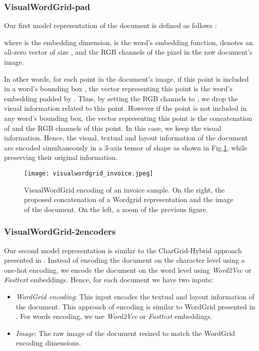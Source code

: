\documentclass[runningheads]{llncs}
\begin{document}
\subsubsection{VisualWordGrid-pad}\hfill

Our first model representation of the document is defined as follows :
 


where  is the embedding dimension,  is the  word's embedding function,  denotes an all-zero vector of size , and  the RGB channels of the  pixel in the raw document's image. 

In other words, for each point in the document's image, if this point is included in a word's bounding box , the vector representing this point is the word's embedding padded by . Thus, by setting the RGB channels to , we drop the visual information related to this point. However if the point is not included in any word's bounding box, the vector representing this point is the concatenation of  and the RGB channels of this point. In this case, we keep the visual information.
Hence, the visual, textual and layout information of the document are encoded simultaneously in a 3-axis tensor of shape  as shown in Fig.\ref{fig:visualwordgrid}, while preserving their original information.

\begin{figure}[!h]
\centering
\texttt{[image: visualwordgrid\_invoice.jpeg]}
\caption{VisualWordGrid encoding of an invoice sample. On the right, the proposed concatenation of a Wordgrid representation  and the image of the document. On the left, a zoom of the previous figure.}
\label{fig:visualwordgrid}  
\end{figure}

\subsubsection{VisualWordGrid-2encoders}\hfill

Our second model representation is similar to the CharGrid-Hybrid approach presented in \cite{chargrid}. Instead of encoding the document on the character level using a one-hot encoding, we encode the document on the word level using \textit{Word2Vec} \cite{word2vec}  or  \textit{Fasttext} \cite{fasttext} embeddings. Hence, for each document we have two inputs:
\begin{itemize}
\item \textit{WordGrid encoding}: This input encodes the textual and  layout information of the document.  This approach of encoding is similar to WordGrid presented in \cite{chargrid}.
For words encoding, we use \textit{Word2Vec} or  \textit{Fasttext} embeddings.



\item \textit{Image}: The raw image of the document resized to match the WordGrid encoding dimensions. 
\end{itemize}
\end{document}

